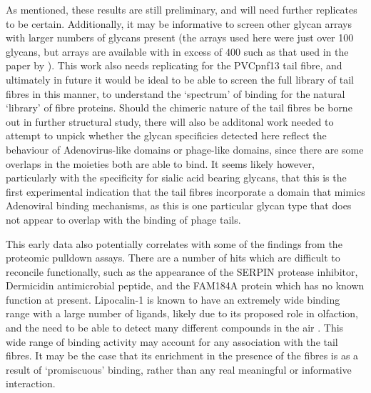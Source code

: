 As mentioned, these results are still preliminary, and will need further replicates to be certain. Additionally, it may be informative to screen other glycan arrays with larger numbers of glycans present (the arrays used here were just over 100 glycans, but arrays are available with in excess of 400 such as that used in the paper by \cite{Guardado-Calvo2010}). This work also needs replicating for the PVCpnf13 tail fibre, and ultimately in future it would be ideal to be able to screen the full library of tail fibres in this manner, to understand the `spectrum' of binding for the natural `library' of fibre proteins. Should the chimeric nature of the tail fibres be borne out in further structural study, there will also be additonal work needed to attempt to unpick whether the glycan specificies detected here reflect the behaviour of Adenovirus-like domains or phage-like domains, since there are some overlaps in the moieties both are able to bind. It seems likely however, particularly with the specificity for sialic acid bearing glycans, that this is the first experimental indication that the tail fibres incorporate a domain that mimics Adenoviral binding mechanisms, as this is one particular glycan type that does not appear to overlap with the binding of phage tails.

This early data also potentially correlates with some of the findings from the proteomic pulldown assays. There are a number of hits which are difficult to reconcile functionally, such as the appearance of the SERPIN protease inhibitor, Dermicidin antimicrobial peptide, and the FAM184A protein which has no known function at present. Lipocalin-1 is known to have an extremely wide binding range with a large number of ligands, likely due to its proposed role in olfaction, and the need to be able to detect many different compounds in the air \citep{Flower1996}. This wide range of binding activity may account for any association with the tail fibres. It may be the case that its enrichment in the presence of the fibres is as a result of `promiscuous' binding, rather than any real meaningful or informative interaction.

